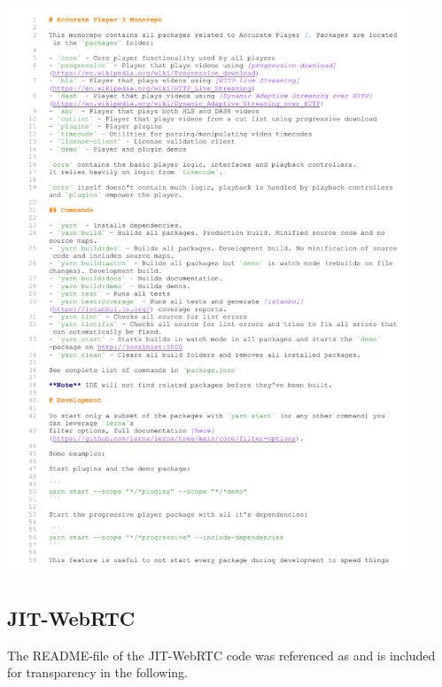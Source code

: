 \documentclass[12pt,a4paper]{article}
\begin{document}
\includegraphics[page=2, width=0.9\textwidth]{FE.pdf}



\newpage
\subsection{JIT-WebRTC} \label{appendix:readmejitwebrtc}

The README-file of the JIT-WebRTC code was referenced as \cite{RM_Backend} and is included for transparency in the following.
\end{document}
